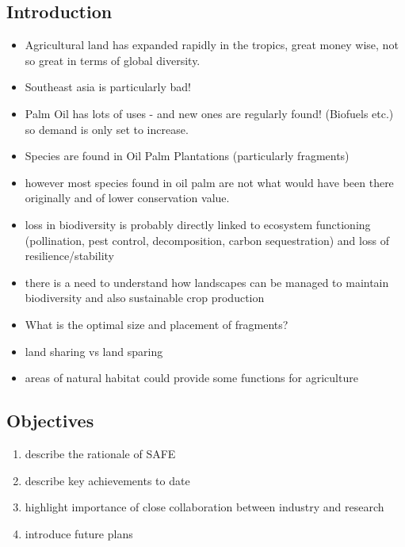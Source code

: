 \subsection*{Introduction}
\begin{itemize}
	\item Agricultural land has expanded rapidly in the tropics, great money wise, not so great in terms of global diversity.
	\item Southeast asia is particularly bad!
	\item Palm Oil has lots of uses - and new ones are regularly found! (Biofuels etc.) so demand is only set to increase.
	\item Species are found in Oil Palm Plantations (particularly fragments)
	\item however most species found in oil palm are not what would have been there originally and of lower conservation value.
	\item loss in biodiversity is probably directly linked to ecosystem functioning (pollination, pest control, decomposition, carbon sequestration) and loss of resilience/stability
	\item there is a need to understand how landscapes can be managed to maintain biodiversity and also sustainable crop production
	\item What is the optimal size and placement of fragments?
	\item land sharing vs land sparing
	\item areas of natural habitat could provide some functions for agriculture
\end{itemize}

\subsection*{Objectives}
\begin{enumerate}
	\item describe the rationale of SAFE
	\item describe key achievements to date
	\item highlight importance of close collaboration between industry and research
	\item introduce future plans
\end{enumerate}


